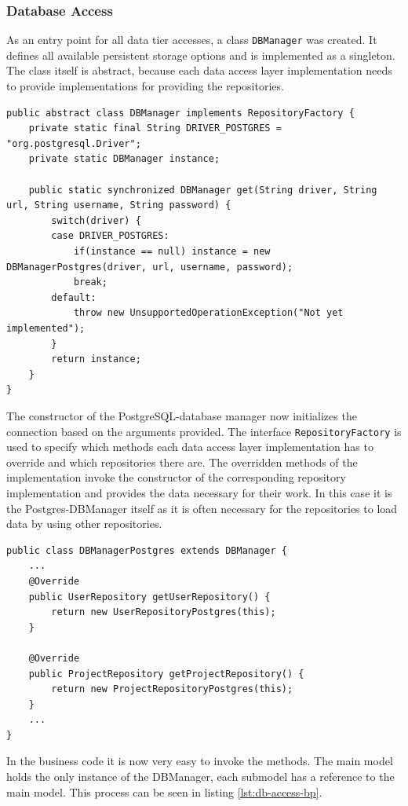 \subsubsection{Database Access}
As an entry point for all data tier accesses, a class \texttt{DBManager} was created. It defines all available persistent storage options and is implemented as a singleton. The class itself is abstract, because each data access layer implementation needs to provide implementations for providing the repositories.
\begin{lstlisting}[caption={[DBManager singleton class.]DBManager singleton class. Used for instantiating the implementation of the chosen interface.}, captionpos=b, label={lst:dbmanager}]
public abstract class DBManager implements RepositoryFactory {
	private static final String DRIVER_POSTGRES = "org.postgresql.Driver";
	private static DBManager instance;
	
	public static synchronized DBManager get(String driver, String url, String username, String password) {
		switch(driver) {
		case DRIVER_POSTGRES:
			if(instance == null) instance = new DBManagerPostgres(driver, url, username, password);
			break;
		default:
			throw new UnsupportedOperationException("Not yet implemented");
		}
		return instance;
	}
}
\end{lstlisting}

The constructor of the PostgreSQL-database manager now initializes the connection based on the arguments provided. The interface \texttt{RepositoryFactory} is used to specify which methods each data access layer implementation has to override and which repositories there are. The overridden methods of the implementation invoke the constructor of the corresponding repository implementation and provides the data necessary for their work. In this case it is the Postgres-DBManager itself as it is often necessary for the repositories to load data by using other repositories.

\begin{lstlisting}[caption={Code snippet on how a DBManager implementation instantiates its repositories.}, captionpos=b]
public class DBManagerPostgres extends DBManager {
	...
	@Override
	public UserRepository getUserRepository() {
		return new UserRepositoryPostgres(this);
	}
	
	@Override
	public ProjectRepository getProjectRepository() {
		return new ProjectRepositoryPostgres(this);
	}
	...
}
\end{lstlisting}

In the business code it is now very easy to invoke the methods. The main model holds the only instance of the DBManager, each submodel has a reference to the main model. This process can be seen in listing \ref{lst:db-access-bp}.

